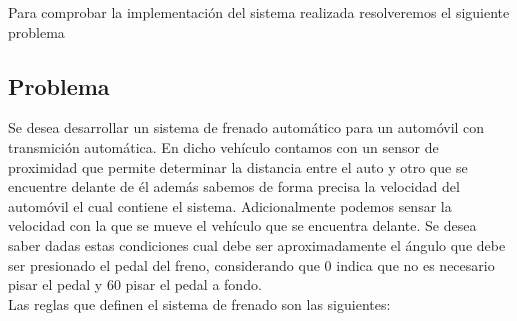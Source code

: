 \documentclass[a4paper,10pt,twocolumn]{article}
\begin{document}
Para comprobar la implementaci\'on del sistema realizada resolveremos el siguiente problema

\subsection*{Problema}

Se desea desarrollar un sistema de frenado autom\'atico para un autom\'ovil con transmici\'on autom\'atica. En dicho veh\'iculo contamos con un sensor de proximidad que permite determinar la distancia entre el auto y otro que se encuentre delante de \'el adem\'as sabemos de forma precisa la velocidad del autom\'ovil el cual contiene el sistema. Adicionalmente podemos sensar la velocidad con la que se mueve el veh\'iculo que se encuentra delante. Se desea saber dadas estas condiciones cual debe ser aproximadamente el \'angulo que debe ser presionado el pedal del freno, considerando que $0$ indica que no es necesario pisar el pedal y $60$ pisar el pedal a fondo. 
\\

Las reglas que definen el sistema de frenado son las siguientes:
\end{document}
